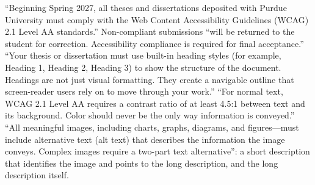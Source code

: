 
%
%
%
\thesisrequiretagging
\thesisrequiredocumentlanguage
{}
	{``Beginning Spring 2027, all theses and dissertations deposited with Purdue
	 University must comply with the Web Content Accessibility Guidelines (WCAG)
	 2.1 Level AA standards.'' Non-compliant submissions ``will be returned to
	 the student for correction. Accessibility compliance is required for final
	 acceptance.''}
	{``Your thesis or dissertation must use built-in heading styles (for
	 example, Heading 1, Heading 2, Heading 3) to show the structure of the
	 document. Headings are not just visual formatting. They create a navigable
	 outline that screen-reader users rely on to move through your work.''}
	{``For normal text, WCAG 2.1 Level AA requires a contrast ratio of at least
	 4.5:1 between text and its background. Color should never be the only way
	 information is conveyed.''}
	{``All meaningful images, including charts, graphs, diagrams, and
	 figures---must include alternative text (alt text) that describes the
	 information the image conveys. Complex images require a two-part text
	 alternative'': a short description that identifies the image and points to
	 the long description, and the long description itself.}
